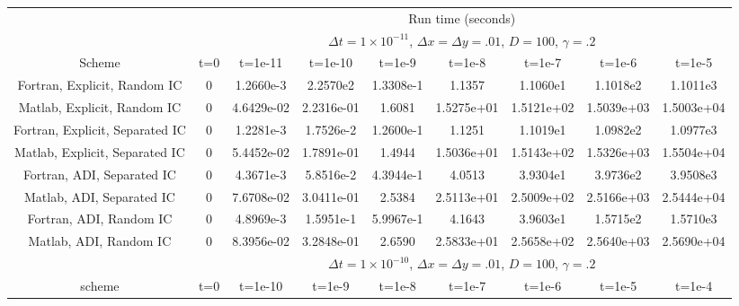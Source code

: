 \documentclass[]{article}
\theoremstyle{definition}
\numberwithin{equation}{section}
\numberwithin{equation}{section}
\begin{document}
	\begin{adjustwidth}{-2.5cm}{}
	\begin{center}
		\begin{table}[H]
	\begin{adjustbox}{angle=90}
		\begin{tabular} {c|c|c|c|c|c|c|c|c|}
			\cline{2-9}
			&  \multicolumn{8}{c|}{Run time (seconds)} \\  \cline{2-9}
			&  \multicolumn{8}{c|}{$\Delta t=1\times10^{-11}$, $\Delta x = \Delta y =.01$, $D = 100$, $\gamma = .2$} \\ \cline{2-9} 
			Scheme & t=0 & t=1e-11 & t=1e-10 & t=1e-9 & t=1e-8 & t=1e-7 & t=1e-6 & t=1e-5 \\ 
			\hline
			\multicolumn{1}{|c|}{Fortran, Explicit, Random IC} 	& 0 & 1.2660e-3 &   2.2570e2 &  1.3308e-1 & 1.1357 & 1.1060e1 & 1.1018e2 & 1.1011e3  \\
			\hline
			\multicolumn{1}{|c|}{Matlab, Explicit, Random IC} 	& 0 &  4.6429e-02 &   2.2316e-01 &  1.6081 & 1.5275e+01 & 1.5121e+02 & 1.5039e+03 & 1.5003e+04 \\
			\hline
			\multicolumn{1}{|c|}{Fortran, Explicit, Separated IC} & 0 & 1.2281e-3 &  1.7526e-2 & 1.2600e-1 & 1.1251 & 1.1019e1 & 1.0982e2 & 1.0977e3  \\
			\hline
			\multicolumn{1}{|c|}{Matlab, Explicit, Separated IC} & 0 & 5.4452e-02 & 1.7891e-01 & 1.4944 & 1.5036e+01 &1.5143e+02 & 1.5326e+03 & 1.5504e+04  \\
			\hline
			\multicolumn{1}{|c|}{Fortran, ADI, Separated IC}  & 0 &  4.3671e-3 &  5.8516e-2 & 4.3944e-1 &4.0513 & 3.9304e1 & 3.9736e2 & 3.9508e3  \\
			\hline
			\multicolumn{1}{|c|}{Matlab, ADI, Separated IC}  & 0 &  7.6708e-02 &   3.0411e-01 &2.5384 &2.5113e+01 &2.5009e+02 & 2.5166e+03 & 2.5444e+04 \\
			\hline
			\multicolumn{1}{|c|}{Fortran, ADI, Random IC}  & 0 &  4.8969e-3 &  1.5951e-1 & 5.9967e-1 &4.1643 & 3.9603e1 & 1.5715e2 & 1.5710e3  \\
			\hline
			\multicolumn{1}{|c|}{Matlab, ADI, Random IC}  & 0 &  8.3956e-02 &  3.2848e-01 &  2.6590 & 2.5833e+01 & 2.5658e+02 &2.5640e+03 & 2.5690e+04  \\
			\hline
			&  \multicolumn{8}{c|}{$\Delta t=1\times10^{-10}$, $\Delta x = \Delta y = .01$, $D = 100$, $\gamma = .2$} \\ \cline{2-9} 
			scheme & t=0 & t=1e-10 & t=1e-9 & t=1e-8 & t=1e-7 & t=1e-6 & t=1e-5 & t=1e-4\\ 
			\hline

\end{tabular}
\end{adjustbox}
\end{table}
\end{center}
\end{adjustwidth}
\end{document}
